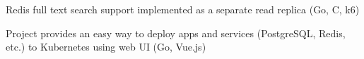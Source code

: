 \documentclass[10pt,a4paper,ragged2e,withhyper]{altacv}
\begin{document}
\begin{paracol}{2}
Redis full text search support implemented as a separate read replica (Go, C, k6)


\divider


Project provides an easy way to deploy apps and services (PostgreSQL, Redis, etc.) to Kubernetes using web UI (Go, Vue.js)


\end{paracol}
\end{document}
